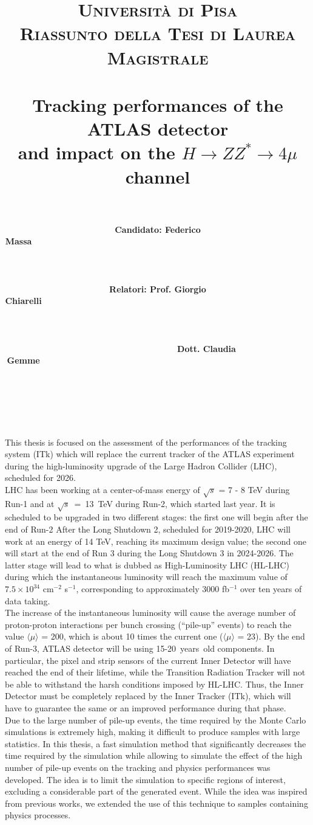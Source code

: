 \documentclass[paper=a4, fontsize=11pt]{scrartcl}	%
\title{
		\usefont{OT1}{bch}{b}{n}
		\normalfont \normalsize \textsc{Universit\`a di Pisa} \\
		\normalfont \normalsize \textsc{Riassunto della Tesi di Laurea Magistrale}\\ [25pt]
		\horrule{0.5pt} \\[0.4cm]
		\huge  Tracking performances of the ATLAS detector \\
			and impact on the $H\rightarrow ZZ^{*}\rightarrow 4\mu$ channel\\
		\horrule{2pt} \\[0.0cm]
}
\author{
		\normalfont 								\normalsize
        \textbf{Candidato: Federico Massa\ \ \ \ \ \ \ \ \ \ \ \ \ \ \ \ \ \ \ \ \ \ \ \ \ \ \ \ \ \ \ \ \ \ \ \ \ \ \ \ \ \ \ \ \ \ \ \ \ \ \ \ \ \ \ \ \ \ \ \ \ \ \ \ \ \ \ \ \ \ \ \ \ \ \ \ \ \ \ \ \ \ \ \ \ \ \ \ \ \ \ \ \ \ \ \ \ \ \ \ \ \ \ \ \ \ \ \ \ \ \ \ \ \ \ \ \ \ \ \ \ \ \ \ \ \ \ \ \ \ \ \ \ \ \ \ \ \ \ \ \ \ \ \ \ \ \ \ \ \ \ \ \ \ \ \ \ \ \ \ \ \ \ \ \ \ \ \ \ \ \ \ \ \ \ \ \ \ \ \ \ \ \ \ \ \ \ \ \ \ \ \ \ \ \ \ \ \ \ \ \ \ \ \ \ \ \ \ \ \ \ \ \ \ \ \ \ \ \ \ \ \ \ \ } \\[-3pt]		\normalsize
        \textbf{Relatori: Prof. Giorgio Chiarelli\ \ \ \ \ \ \ \ \ \ \ \ \ \ \ \ \ \ \ \ \ \ \ \ \ \ \ \ \ \ \ \ \ \ \ \ \ \ \ \ \ \ \ \ \ \ \ \ \ \ \ \ \ \ \ \ \ \ \ \ \ \ \ \ \ \ \ \ \ \ \ \ \ \ \ \ \ \ \ \ \ \ \ \ \ \ \ \ \ \ \ \ \ \ \ \ \ \ \ \ \ \ \ \ \ \ \ \ \ \ \ \ \ \ \ \ \ \ \ \ \ \ \ \ \ \ \ \ \ \ \ \ \ \ \ \ \ \ \ \ \ \ \ \ \ \ \ \ \ \ \ \ \ \ \ \ \ \ \ \ \ \ \ \ \ \ \ \ \ \ \ \ \ \ \ \ \ \ \ \ \ \ \ \ \ \ \ \ \ \ \ \ \ \ \ \ \ \ \ \ \ \ \ \ \ \ \ \ \ \ \ \ \ \ } \\ [-3pt]\normalsize
        \textbf{\ \ \ \ \ \ \ \ \ \ \ \ \ \ \ \ \ \ \ \ Dott. Claudia Gemme\ \ \ \ \ \ \ \ \ \ \ \ \ \ \ \ \ \ \ \ \ \ \ \ \ \ \ \ \ \ \ \ \ \ \ \ \ \ \ \ \ \ \ \ \ \ \ \ \ \ \ \ \ \ \ \ \ \ \ \ \ \ \ \ \ \ \ \ \ \ \ \ \ \ \ \ \ \ \ \ \ \ \ \ \ \ \ \ \ \ \ \ \ \ \ \ \ \ \ \ \ \ \ \ \ \ \ \ \ \ \ \ \ \ \ \ \ \ \ \ \ \ \ \ \ \ \ \ \ \ \ \ \ \ \ \ \ \ \ \ \ \ \ \ \ \ \ \ \ \ \ \ \ \ \ \ \ \ \ \ \ \ \ \ \ \ \ \ \ \ \ \ \ \ \ \ \ \ \ \ \ \ \ \ \ \ \ \ \ \ \ \ \ \ \ \ \ \ \ \ \ \ \ \ \ \ \ \ \ \ \ \ \ \ }
}
\date{}
\numberwithin{equation}{section}		%
\numberwithin{figure}{section}			%
\numberwithin{table}{section}				%
\begin{document}
\maketitle

This thesis is focused on the assessment of the performances of the tracking system (ITk) which
will replace the current tracker of the ATLAS experiment during the high-luminosity upgrade of
the Large Hadron Collider (LHC), scheduled for 2026. \\

LHC has been working at a center-of-mass
energy of $\sqrt{s}$ = 7 - 8 TeV during Run-1 and at \mbox{$\sqrt{s}$ = 13 TeV} during Run-2, which started last year. It is scheduled to be upgraded in two different stages: the 
first one will begin after the end of Run-2 After the Long Shutdown 2, scheduled for 2019-2020, LHC will work at
an energy of 14 TeV, reaching its maximum design value; the second one will start at
the end of Run 3 during the Long Shutdown 3 in 2024-2026. The latter stage will lead
to what is dubbed as High-Luminosity LHC (HL-LHC) during which the 
instantaneous luminosity will reach the maximum value of $7.5 \times 10^{34}$ cm$^{-2}$ s${^{-1}}$, corresponding to approximately 3000 fb$^{-1}$ over ten years of data taking. \\

The increase of the instantaneous luminosity will cause the average number of proton-proton interactions per bunch crossing (``pile-up'' events) to reach the value $\langle\mu\rangle$ = 200, which 
is about 10 times the current one ($\langle\mu\rangle$ = 23). By the end of Run-3, ATLAS detector will be using \mbox{15-20 years old} components. In particular, the pixel and strip sensors of the current Inner Detector will have reached the end of their lifetime, while the Transition
Radiation Tracker will not be able to withstand the harsh conditions imposed by HL-LHC. Thus,
 the Inner Detector must be completely replaced by the Inner Tracker (ITk), which will have
 to guarantee the same or an improved performance during that phase.\\

Due to the large number of pile-up events, the time required by the Monte Carlo simulations 
is extremely high, making it difficult to produce samples with large statistics. In this thesis,
a fast simulation method that significantly decreases the time required by the simulation while
allowing to simulate the effect of the high number of pile-up events on the tracking
and physics performances was developed. The idea is to limit the simulation to specific regions of interest, excluding a considerable part of the generated event. While the idea was inspired
from previous works, we extended the use of this technique to samples containing physics 
processes.\\
\end{document}
